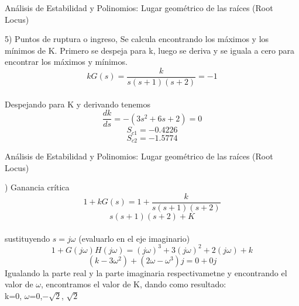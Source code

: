 \documentclass{beamer}
\begin{document}
\begin{frame}{Análisis de Estabilidad y Polinomios: Lugar geométrico de las raíces (Root Locus)}
\begin{justify}
\begin{itemize}
 5) Puntos de ruptura o ingreso,
 Se calcula encontrando los máximos y los mínimos de K. Primero se despeja para k, luego se deriva y se iguala a cero para encontrar los máximos y mínimos.
 \begin{equation*}\label{rl-ejemplo-2}
   kG(s)=\frac{k}{s(s+1)(s+2)}=-1
\end{equation*}
\\
Despejando para K y derivando tenemos
\\
 \begin{equation*}\label{rl-ejemplo-2}
   \frac{dk}{ds}=-(3s^2+6s+2)=0
\end{equation*}
 \begin{equation*}\label{rl-ejemplo-2}
   S_{c1}=-0.4226
\end{equation*}
 \begin{equation*}\label{rl-ejemplo-2}
    S_{c2}=-1.5774
\end{equation*}

\end{itemize}
\end{justify}
\end{frame}

\begin{frame}{Análisis de Estabilidad y Polinomios: Lugar geométrico de las raíces (Root Locus)}
\begin{justify}
\begin{itemize}
) Ganancia crítica
 \begin{equation*}\label{rl-ejemplo-2}
   1+kG(s)=1+\frac{k}{s(s+1)(s+2)}
\end{equation*}
\begin{equation*}\label{rl-ejemplo-2}
  s(s+1)(s+2)+K
\end{equation*}
\\
sustituyendo $s=j\omega$ (evaluarlo en el eje imaginario)
\\
 \begin{equation*}\label{rl-ejemplo-2}
   1+G(j\omega)H(j\omega)=(j\omega)^3+3(j\omega)^2+2(j\omega)+k
\end{equation*}
 \begin{equation*}\label{rl-ejemplo-2}
  (k-3\omega^2)+(2\omega-\omega^3)j=0+0j
\end{equation*}
Igualando la parte real y la parte imaginaria respectivametne y encontrando el valor de $\omega$, encontramos el valor de K,
dando como resultado:
\\
k=0, $\omega$=0,$-\sqrt{2}$, $\sqrt{2}$

\end{itemize}
\end{justify}
\end{frame}
\end{document}
